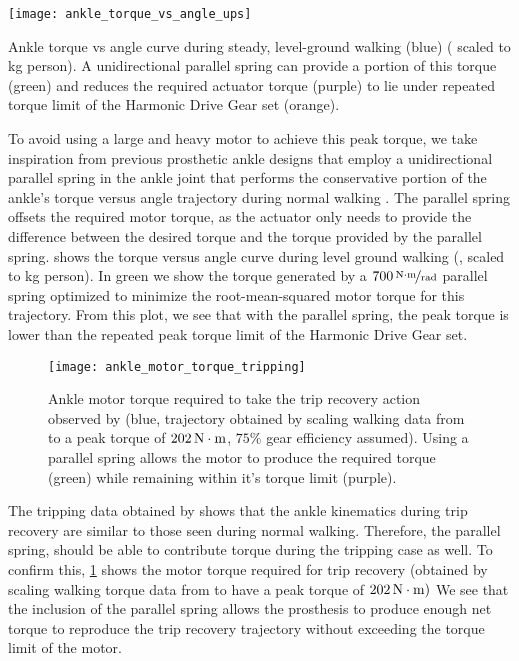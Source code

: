 \begin{marginfigure}[-0in]
    \centering 
    \texttt{[image: ankle\_torque\_vs\_angle\_ups]}
    \caption{Ankle torque vs angle curve during steady, level-ground walking
    (blue) (\citet{winter2009biomechanics} scaled to \unit[80]{kg} person). A
    unidirectional parallel spring can provide a portion of this torque (green)
    and reduces the required actuator torque (purple) to lie under repeated
    torque limit of the Harmonic Drive Gear set (orange).
    }\label{fig:ankle_torque_vs_angle_ups}
\end{marginfigure}
To avoid using a large and heavy motor to achieve this peak torque, we take
inspiration from previous prosthetic ankle designs that employ a unidirectional
parallel spring in the ankle joint that performs the conservative portion of the
ankle's torque versus angle trajectory during normal walking
\citep{au2007biomechanical,au2008powered,sup2009preliminary,lawson2014robotic}.
The parallel spring offsets the required motor torque, as the actuator only
needs to provide the difference between the desired torque and the torque
provided by the parallel spring.  shows the
torque versus angle curve during level ground walking
(\citet{winter2009biomechanics}, scaled to \unit[80]{kg} person). In green we
show the torque generated by a $\unitfrac[700]{N \cdot m}{rad}$ parallel spring
optimized to minimize the root-mean-squared motor torque for this trajectory.
From this plot, we see that with the parallel spring, the peak torque is lower
than the repeated peak torque limit of the Harmonic Drive Gear set.
\begin{figure}[b]
    \centering 
    \texttt{[image: ankle\_motor\_torque\_tripping]}
    \caption{Ankle motor torque required to take the trip recovery action
    observed by \citet{pijnappels2005early} (blue, trajectory obtained by
    scaling walking data from \citet{winter2009biomechanics} to a peak torque of
    $\unit[202]{N \cdot m}$, $75\%$ gear efficiency assumed). Using a parallel
    spring allows the motor to produce the required torque (green) while
    remaining within it's torque limit (purple).
    }\label{fig:ankle_motor_torque_tripping}
\end{figure}

The tripping data obtained by \citet{pijnappels2005early} shows that the ankle
kinematics during trip recovery are similar to those seen during normal walking.
Therefore, the parallel spring, should be able to contribute torque during the
tripping case as well. To confirm this, \cref{fig:ankle_motor_torque_tripping}
shows the motor torque required for trip recovery (obtained by scaling walking
torque data from \citet{winter2009biomechanics} to have a peak torque of
$\unit[202]{N \cdot m})$ We see that the inclusion of the parallel spring allows
the prosthesis to produce enough net torque to reproduce the trip recovery
trajectory without exceeding the torque limit of the motor. 

